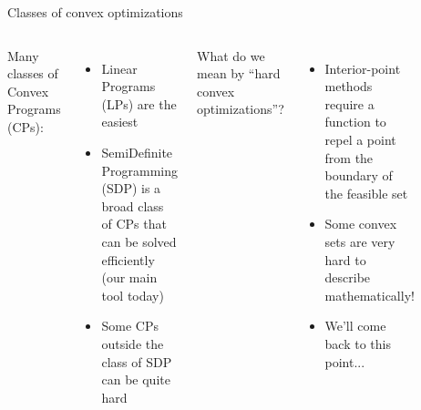 \documentclass[aspectratio=169]{beamer}
\begin{document}
\begin{frame}{Classes of convex optimizations}
\begin{columns}
Many classes of Convex Programs (CPs):
\begin{itemize}
\item
Linear Programs (LPs) are the easiest
\item
SemiDefinite Programming (SDP) is a broad class of CPs that can be solved efficiently (our main tool today)
\item
Some CPs outside the class of SDP can be quite hard
\end{itemize}
What do we mean by ``hard convex optimizations''? 
\begin{itemize}
\item
Interior-point methods require a function to repel a point from the boundary of the feasible set
\item
Some convex sets are very hard to describe mathematically!
\item
We'll come back to this point...
\end{itemize}
\begin{figure}
\includegraphics[width=\columnwidth]{figures/hierarchy.png}
\end{figure}
\end{columns}
\end{frame}
\end{document}

